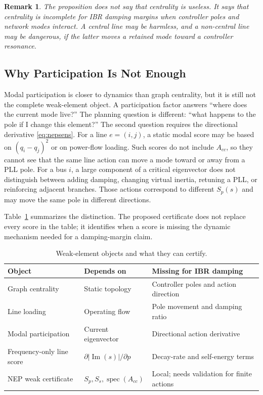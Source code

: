 \documentclass[conference]{IEEEtran}
\newtheorem{remark}{Remark}
\newcommand{\Imag}{\operatorname{Im}}
\newcommand{\spec}{\operatorname{spec}}
\begin{document}
\begin{remark}
The proposition does not say that centrality is useless. It says that centrality is incomplete for IBR damping margins when controller poles and network modes interact. A central line may be harmless, and a non-central line may be dangerous, if the latter moves a retained mode toward a controller resonance.
\end{remark}

\subsection{Why Participation Is Not Enough}

Modal participation is closer to dynamics than graph centrality, but it is still not the complete weak-element object. A participation factor answers ``where does the current mode live?'' The planning question is different: ``what happens to the pole if I change this element?'' The second question requires the directional derivative \eqref{eq:nepsens}. For a line $e=(i,j)$, a static modal score may be based on $(q_i-q_j)^2$ or on power-flow loading. Such scores do not include $A_{cc}$, so they cannot see that the same line action can move a mode toward or away from a PLL pole. For a bus $i$, a large component of a critical eigenvector does not distinguish between adding damping, changing virtual inertia, retuning a PLL, or reinforcing adjacent branches. Those actions correspond to different $S_p(s)$ and may move the same pole in different directions.

Table~\ref{tab:baseline_objects} summarizes the distinction. The proposed certificate does not replace every score in the table; it identifies when a score is missing the dynamic mechanism needed for a damping-margin claim.

\begin{table}[t]
\caption{Weak-element objects and what they can certify.}
\label{tab:baseline_objects}
\centering
\scriptsize
\setlength{\tabcolsep}{2pt}
\begin{tabular}{p{}p{}p{}}
\toprule
Object & Depends on & Missing for IBR damping\\
\midrule
Graph centrality & Static topology & Controller poles and action direction\\
Line loading & Operating flow & Pole movement and damping ratio\\
Modal participation & Current eigenvector & Directional action derivative\\
Frequency-only line score & $\partial|\Imag(s)|/\partial p$ & Decay-rate and self-energy terms\\
NEP weak certificate & $S_p,S_s,\spec(A_{cc})$ & Local; needs validation for finite actions\\
\bottomrule
\end{tabular}
\end{table}
\end{document}
